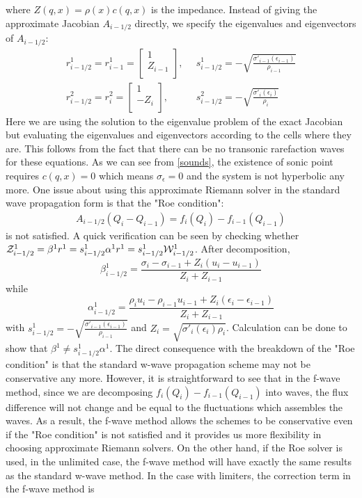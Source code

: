 \documentclass{article}
\begin{document}
where $Z(q,x)=\rho(x)c(q,x)$ is the impedance.
Instead of giving the approximate Jacobian $A_{i-1/2}$ directly, we specify the eigenvalues and eigenvectors of $A_{i-1/2}$:
\begin{align}
r^1_{i-1/2}=r^1_{i-1}=\left[
                        \begin{array}{c}
                          1 \\ Z_{i-1} \\
                        \end{array}
                      \right], & \,\,\, s^1_{i-1/2}=-\sqrt{\frac{\sigma'_{i-1}(\epsilon_{i-1})}{\rho_{i-1}}}\\
r^2_{i-1/2}=r^2_{i}=\left[
                        \begin{array}{c}
                          1 \\ -Z_{i} \\
                        \end{array}
                      \right], &\,\,\, s^2_{i-1/2}=-\sqrt{\frac{\sigma'_{i}(\epsilon_{i})}{\rho_{i}}}
\end{align}
Here we are using the solution to the eigenvalue problem of the exact Jacobian but evaluating the eigenvalues and eigenvectors according to the cells where they are. This follows from the fact that there can be no transonic rarefaction waves for these equations. As we can see from \eqref{sounds}, the existence of sonic point requires $c(q,x)=0$ which means $\sigma_{\epsilon}=0$ and the system is not hyperbolic any more. %
One issue about using this approximate Riemann solver in the standard wave propagation form is that the "Roe condition":
\begin{align}
A_{i-1/2}(Q_i-Q_{i-1})=f_{i}(Q_i)-f_{i-1}(Q_{i-1})
\end{align}
is not satisfied.
A quick verification can be seen by checking whether ${\cal Z}^1_{i-1/2}=\beta^1 r^1=s^1_{i-1/2} \alpha^1r^1=s^1_{i-1/2}{\cal W}^1_{i-1/2}$. After decomposition,
\[
\beta^1_{i-1/2}=\frac{\sigma_i-\sigma_{i-1}+{ Z}_i(u_i-u_{i-1})}{{ Z}_i+{ Z}_{i-1}}
\]
while
\[
\alpha^1_{i-1/2}=\frac{\rho_i u_i-\rho_{i-1}u_{i-1}+Z_i(\epsilon_i-\epsilon_{i-1})}{Z_i+Z_{i-1}}
\]
with $s^1_{i-1/2}=-\sqrt{\frac{\sigma'_{i-1}(\epsilon_{i-1})}{\rho_{i-1}}}$
and $Z_i=\sqrt{\sigma'_{i}(\epsilon_{i})\rho_{i}}$. Calculation can be done to show that $ \beta^1 \neq s^1_{i-1/2} \alpha^1$. The direct consequence with the breakdown of the "Roe condition" is that the standard w-wave propagation scheme may not be conservative any more. However, it is straightforward to see that in the f-wave method, since we are decomposing $f_{i}(Q_i)-f_{i-1}(Q_{i-1})$ into waves, the flux difference will not change and be equal to the fluctuations which assembles the waves. As a result, the f-wave method allows the schemes to be conservative even if the "Roe condition" is not satisfied and it provides us more flexibility in choosing approximate Riemann solvers. On the other hand, if the Roe solver is used, in the unlimited case, the f-wave method will have exactly the same results as the standard w-wave method. In the case with limiters, the correction term in the f-wave method is
\end{document}
